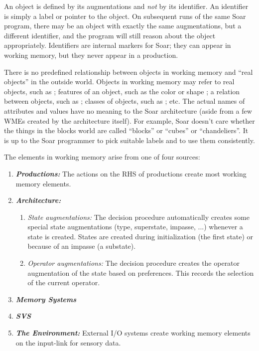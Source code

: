 An object is defined by its augmentations and \emph{not} by its identifier. An identifier is simply a label or pointer to the object. On subsequent runs of the same Soar program, there may be an object with exactly the same augmentations, but a different identifier, and the program will still reason about the object appropriately. Identifiers are internal markers for Soar; they can appear in working memory, but they never appear in a production.

There is no predefined relationship between objects in working memory and ``real objects'' in the outside world.  Objects in working memory may refer to real objects, such as ; features of an object, such as the color  or shape ; a relation between objects, such as ; classes of objects, such as ; etc. The actual names of attributes and values have no meaning to the Soar architecture (aside from a few WMEs created by the architecture itself). For example, Soar doesn't care whether the things in the blocks world are called ``blocks'' or ``cubes'' or ``chandeliers''. It is up to the Soar programmer to pick suitable labels and to use them consistently.

The elements in working memory arise from one of four sources:

\vspace{-12pt}
\begin{enumerate}
	\item \textbf{\textit{Productions:}} 
		The actions on the RHS of productions create most working memory elements.
	\vspace{-8pt}
	\item \textbf{\textit{Architecture:}} 
	\vspace{-8pt}
	\begin{enumerate}
		\item \textit{State augmentations:} 
			The decision procedure automatically creates some special state augmentations (type, superstate, impasse, ...) whenever a state is created.  States are created during initialization (the first state) or because of an impasse (a substate).  
		\vspace{-4pt}
		\item \textit{Operator augmentations:} 
			The decision procedure creates the operator augmentation of the state based on preferences. This records the selection of the current operator.
		\vspace{-8pt}
	\end{enumerate}
	\item \textbf{\textit{Memory Systems}} 
	\vspace{-8pt}
	\item \textbf{\textit{SVS}} 
	\vspace{-8pt}
	\item \textbf{\textit{The Environment:}} 
		External I/O systems create working memory elements on the input-link for sensory data.
	\vspace{-8pt}
\end{enumerate}

